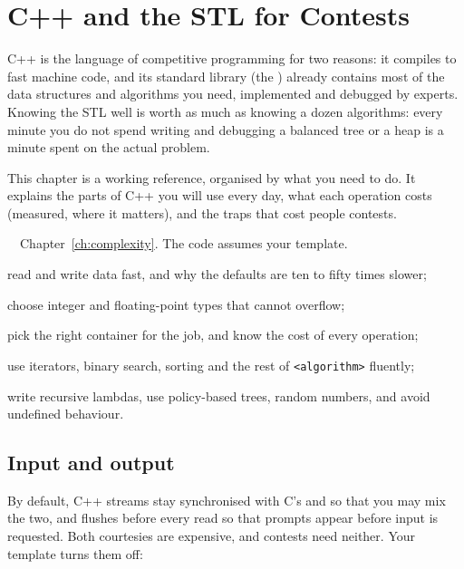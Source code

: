 \chapter{C++ and the STL for Contests}\label{ch:cpp}

C++ is the language of competitive programming for two reasons: it compiles to fast machine code, and its standard library
(the ) already contains most of the data structures and algorithms you need, implemented and debugged by experts.
Knowing the STL well is worth as much as knowing a dozen algorithms: every minute you do not spend writing and debugging a
balanced tree or a heap is a minute spent on the actual problem.

This chapter is a working reference, organised by what you need to do. It explains the parts of C++ you will use every day,
what each operation costs (measured, where it matters), and the traps that cost people contests.

\begin{chapterintro}{\bronze\ \silver\ \gold}{Chapter~\ref{ch:complexity}. The code assumes your template.}
  \item read and write data fast, and why the defaults are ten to fifty times slower;
  \item choose integer and floating-point types that cannot overflow;
  \item pick the right container for the job, and know the cost of every operation;
  \item use iterators, binary search, sorting and the rest of \texttt{<algorithm>} fluently;
  \item write recursive lambdas, use policy-based trees, random numbers, and avoid undefined behaviour.
\end{chapterintro}

\section[Input and output]{Input and output \hfill \bronze}\label{sec:io}

By default, C++ streams stay synchronised with C's  and  so that you may mix the two, and 
flushes  before every read so that prompts appear before input is requested. Both courtesies are expensive, and
contests need neither. Your template turns them off:

